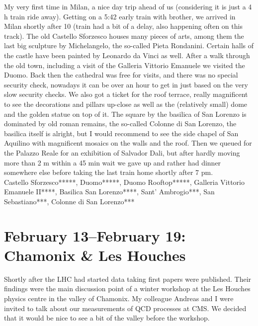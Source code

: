 My very first time in Milan, a nice day trip ahead of us (considering it is just a 4 h train ride away). Getting on a 5:42 early train with brother, we arrived in Milan shortly after 10 (train had a bit of a delay, also happening often on this track). The old Castello Sforzesco houses many pieces of arts, among them the last big sculpture by Michelangelo, the so-called Pieta Rondanini. Certain halls of the castle have been painted by Leonardo da Vinci as well. After a walk through the old town, including a visit of the Galleria Vittorio Emanuele we visited the Duomo. Back then the cathedral was free for visits, and there was no special security check, nowadays it can be over an hour to get in just based on the very slow security checks. We also got a ticket for the roof terrace, really magnificent to see the decorations and pillars up-close as well as the (relatively small) dome and the golden statue on top of it. The square by the basilica of San Lorenzo is dominated by old roman remains, the so-called Colonne di San Lorenzo, the basilica itself is alright, but I would recommend to see the side chapel of San Aquilino with magnificent mosaics on the walls and the roof. Then we queued for the Palazzo Reale for an exhibition of Salvador Dali, but after hardly moving more than 2 m within a 45 min wait we gave up and rather had dinner somewhere else before taking the last train home shortly after 7 pm.\\

Castello Sforzesco*****, Duomo*****, Duomo Rooftop*****, Galleria Vittorio Emanuele II****, Basilica San Lorenzo****, Sant' Ambrogio***, San Sebastiano***, Colonne di San Lorenzo***

\section{February 13--February 19: Chamonix \& Les Houches}
\label{LesHouches2011}

Shortly after the LHC had started data taking first papers were published. Their findings were the main discussion point of a winter workshop at the Les Houches physics centre in the valley of Chamonix. My colleague Andreas and I were invited to talk about our measurements of QCD processes at CMS. We decided that it would be nice to see a bit of the valley before the workshop.\\

